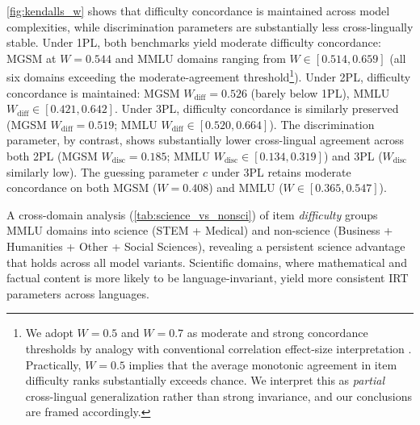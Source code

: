 \documentclass[11pt]{article}
\begin{document}
\autoref{fig:kendalls_w} shows that difficulty concordance is maintained across model complexities, while discrimination parameters are substantially less cross-lingually stable. Under 1PL, both benchmarks yield moderate difficulty concordance: MGSM at $W = 0.544$ and MMLU domains ranging from $W \in [0.514, 0.659]$ (all six domains exceeding the moderate-agreement threshold\footnote{We adopt $W=0.5$ and $W=0.7$ as moderate and strong concordance thresholds by analogy with conventional correlation effect-size interpretation \cite{landis1977measurement}. Practically, $W=0.5$ implies that the average monotonic agreement in item difficulty ranks substantially exceeds chance. We interpret this as \emph{partial} cross-lingual
generalization rather than strong invariance, and our conclusions are framed
accordingly.}). Under 2PL, difficulty concordance is maintained: MGSM $W_\text{diff} = 0.526$ (barely below 1PL), MMLU $W_\text{diff} \in [0.421, 0.642]$. Under 3PL, difficulty concordance is similarly preserved (MGSM $W_\text{diff} = 0.519$; MMLU $W_\text{diff} \in [0.520, 0.664]$). The discrimination parameter, by contrast, shows substantially lower cross-lingual agreement across both 2PL (MGSM $W_\text{disc} = 0.185$; MMLU $W_\text{disc} \in [0.134, 0.319]$) and 3PL ($W_\text{disc}$ similarly low). The guessing parameter $c$ under 3PL retains moderate concordance on both MGSM ($W = 0.408$) and MMLU ($W \in [0.365, 0.547]$).

A cross-domain analysis (\autoref{tab:science_vs_nonsci}) of item \textit{difficulty} groups MMLU domains into science (STEM + Medical) and non-science (Business + Humanities + Other + Social Sciences), revealing a persistent science advantage that holds across all model variants. %
Scientific domains, where mathematical and factual content is more likely to be language-invariant, yield more consistent IRT parameters across languages.
\end{document}
